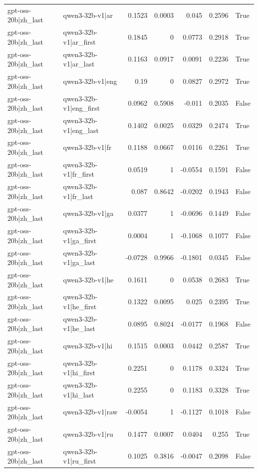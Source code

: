 \begin{table}
\begin{tabular}{l l r r r r l}
gpt-oss-20b|zh_last & qwen3-32b-v1|ar & 0.1523 & 0.0003 & 0.045 & 0.2596 & True \\
gpt-oss-20b|zh_last & qwen3-32b-v1|ar_first & 0.1845 & 0 & 0.0773 & 0.2918 & True \\
gpt-oss-20b|zh_last & qwen3-32b-v1|ar_last & 0.1163 & 0.0917 & 0.0091 & 0.2236 & True \\
gpt-oss-20b|zh_last & qwen3-32b-v1|eng & 0.19 & 0 & 0.0827 & 0.2972 & True \\
gpt-oss-20b|zh_last & qwen3-32b-v1|eng_first & 0.0962 & 0.5908 & -0.011 & 0.2035 & False \\
gpt-oss-20b|zh_last & qwen3-32b-v1|eng_last & 0.1402 & 0.0025 & 0.0329 & 0.2474 & True \\
gpt-oss-20b|zh_last & qwen3-32b-v1|fr & 0.1188 & 0.0667 & 0.0116 & 0.2261 & True \\
gpt-oss-20b|zh_last & qwen3-32b-v1|fr_first & 0.0519 & 1 & -0.0554 & 0.1591 & False \\
gpt-oss-20b|zh_last & qwen3-32b-v1|fr_last & 0.087 & 0.8642 & -0.0202 & 0.1943 & False \\
gpt-oss-20b|zh_last & qwen3-32b-v1|ga & 0.0377 & 1 & -0.0696 & 0.1449 & False \\
gpt-oss-20b|zh_last & qwen3-32b-v1|ga_first & 0.0004 & 1 & -0.1068 & 0.1077 & False \\
gpt-oss-20b|zh_last & qwen3-32b-v1|ga_last & -0.0728 & 0.9966 & -0.1801 & 0.0345 & False \\
gpt-oss-20b|zh_last & qwen3-32b-v1|he & 0.1611 & 0 & 0.0538 & 0.2683 & True \\
gpt-oss-20b|zh_last & qwen3-32b-v1|he_first & 0.1322 & 0.0095 & 0.025 & 0.2395 & True \\
gpt-oss-20b|zh_last & qwen3-32b-v1|he_last & 0.0895 & 0.8024 & -0.0177 & 0.1968 & False \\
gpt-oss-20b|zh_last & qwen3-32b-v1|hi & 0.1515 & 0.0003 & 0.0442 & 0.2587 & True \\
gpt-oss-20b|zh_last & qwen3-32b-v1|hi_first & 0.2251 & 0 & 0.1178 & 0.3324 & True \\
gpt-oss-20b|zh_last & qwen3-32b-v1|hi_last & 0.2255 & 0 & 0.1183 & 0.3328 & True \\
gpt-oss-20b|zh_last & qwen3-32b-v1|raw & -0.0054 & 1 & -0.1127 & 0.1018 & False \\
gpt-oss-20b|zh_last & qwen3-32b-v1|ru & 0.1477 & 0.0007 & 0.0404 & 0.255 & True \\
gpt-oss-20b|zh_last & qwen3-32b-v1|ru_first & 0.1025 & 0.3816 & -0.0047 & 0.2098 & False \\

\end{tabular}
\end{table}
